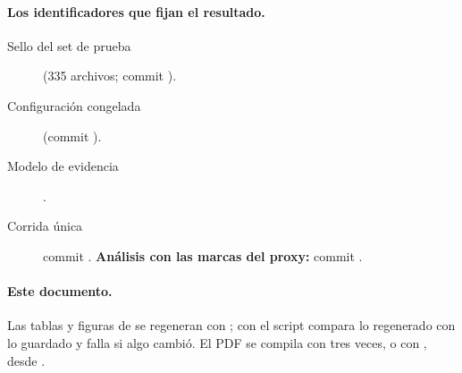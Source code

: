 \paragraph{Los identificadores que fijan el resultado.}
\begin{description}
  \item[Sello del set de prueba] 
    (335 archivos; commit ).
  \item[Configuración congelada] 
    (commit ).
  \item[Modelo de evidencia] .
  \item[Corrida única] commit . \textbf{Análisis con las marcas del proxy:} commit
    .
\end{description}

\paragraph{Este documento.} Las tablas y figuras de  se regeneran con
; con  el script compara lo regenerado con lo
guardado y falla si algo cambió. El PDF se compila con  tres veces, o con
, desde .

